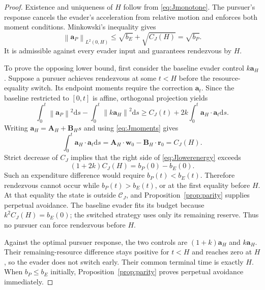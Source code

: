 \documentclass[journal,a4paper]{IEEEtran}
\newcommand{\C}{\mathcal C}
\newcommand{\norm}[1]{\left\|#1\right\|}
\newcommand{\dd}{\mathrm d}
\begin{document}
\begin{proof}
Existence and uniqueness of $H$ follow from \eqref{eq:Jmonotone}. The pursuer's response cancels the evader's acceleration from relative motion and enforces both moment conditions. Minkowski's inequality gives
\begin{equation}
 \norm{\mathbf a_P}_{L^2(0,H)}
 \le\sqrt{b_E}+\sqrt{C_J(H)}=\sqrt{b_P}.
\end{equation}
It is admissible against every evader input and guarantees rendezvous by $H$.

To prove the opposing lower bound, first consider the baseline evader control $k\mathbf a_H$. Suppose a pursuer achieves rendezvous at some $t<H$ before the resource-equality switch. Its endpoint moments require the correction $\mathbf a_t$. Since the baseline restricted to $[0,t]$ is affine, orthogonal projection yields
\begin{equation}
 \int_0^t\norm{\mathbf a_P}^2\dd s
 -\int_0^t\norm{k\mathbf a_H}^2\dd s
 \ge C_J(t)+2k\int_0^t\mathbf a_H\cdot\mathbf a_t\dd s.
 \label{eq:Jlowerenergy}
\end{equation}
Writing $\mathbf a_H=\mathbf A_H+\mathbf B_Hs$ and using \eqref{eq:Jmoments} gives
\begin{equation}
 \int_0^t\mathbf a_H\cdot\mathbf a_t\dd s
 =\mathbf A_H\cdot\mathbf w_0-\mathbf B_H\cdot\mathbf r_0
 =C_J(H).
 \label{eq:Jcross}
\end{equation}
Strict decrease of $C_J$ implies that the right side of \eqref{eq:Jlowerenergy} exceeds
\begin{equation}
 (1+2k)C_J(H)=b_P(0)-b_E(0).
\end{equation}
Such an expenditure difference would require $b_P(t)<b_E(t)$. Therefore rendezvous cannot occur while $b_P(t)>b_E(t)$, or at the first equality before $H$. At that equality the state is outside $\C_J$, and Proposition~\ref{prop:parity} supplies perpetual avoidance. The baseline evader fits its budget because $k^2C_J(H)=b_E(0)$; the switched strategy uses only its remaining reserve. Thus no pursuer can force rendezvous before $H$.

Against the optimal pursuer response, the two controls are $(1+k)\mathbf a_H$ and $k\mathbf a_H$. Their remaining-resource difference stays positive for $t<H$ and reaches zero at $H$, so the evader does not switch early. Their common terminal time is exactly $H$. When $b_P\le b_E$ initially, Proposition~\ref{prop:parity} proves perpetual avoidance immediately.
\end{proof}
\end{document}
